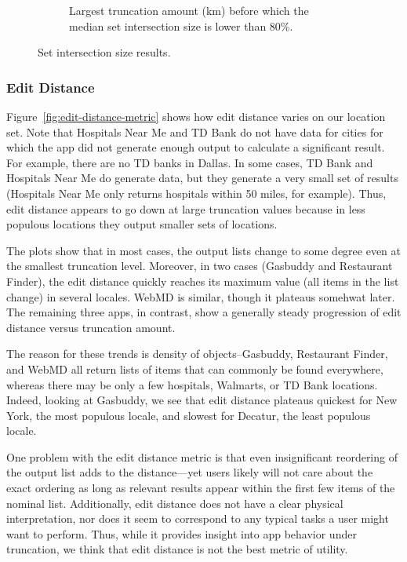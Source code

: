\begin{figure}[t!]
\begin{subfigure}[t]{\textwidth}
\begin{tabular}{|l|rrrrrr|}
\end{tabular}
 \caption{Largest truncation amount (km) before which the median set
   intersection size is lower than 80\%.}
 \label{fig:knee-points-set-cutoff}
  \end{subfigure}
  
  \caption{Set intersection size results.}
\end{figure}

\subsubsection{Edit Distance}

Figure~\ref{fig:edit-distance-metric} shows how edit distance 
 varies
on our location set.  
Note that Hospitals Near Me and TD Bank do
not have data for cities for which the app did not generate enough output
to calculate a significant result. 
For example, there are no TD banks in Dallas.  In some cases,
TD Bank and Hospitals Near Me do generate data, but they generate 
a very small set of results (Hospitals Near Me only returns hospitals
within 50 miles, for example).
Thus, edit distance appears to go down
at large truncation values because in less populous 
locations they output smaller sets of locations.

The plots show that in most cases, the output lists change to some
degree even at the smallest truncation level. Moreover, in two cases
(Gasbuddy and Restaurant Finder), the edit distance quickly reaches
its maximum value (all items in the list change) in several
locales. WebMD is similar, though it plateaus somehwat later. The
remaining three apps, in contrast, show a generally steady progression
of edit distance versus truncation amount.

The reason for these trends is density of objects--Gasbuddy,
Restaurant Finder, and WebMD all return lists of items that can
commonly be found everywhere, whereas there may be only a few
hospitals, Walmarts, or TD Bank locations. Indeed, looking at
Gasbuddy, we see that edit distance plateaus quickest for New York,
the most populous locale, and slowest for Decatur, the least populous
locale.

One problem with the edit distance metric is that even insignificant
reordering of the output list adds to the distance---yet users likely
will not care about the exact ordering as long as relevant results
appear within the first few items of the nominal list. Additionally,
edit distance does not have a clear physical interpretation, nor does
it seem to correspond to any typical tasks a user might want to
perform. Thus, while it provides insight into app behavior under
truncation, we think that edit distance is not the best metric of
utility.

